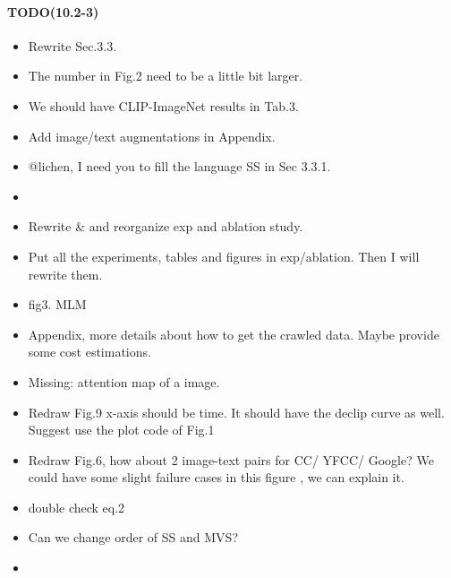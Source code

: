     

\paragraph{TODO(10.2-3)} 
\begin{itemize}
    \item Rewrite Sec.3.3. 
    
    \item The number in Fig.2 need to be a little bit larger.
    
    \item We should have CLIP-ImageNet results in Tab.3.
    
    \item Add image/text augmentations in Appendix.
    
    \item @lichen, I need you to fill the language SS in Sec 3.3.1.
    
    \item {}
    
    \item Rewrite \& and reorganize exp and ablation study. 
    
    \item Put all the experiments, tables and figures in exp/ablation. Then I will rewrite them. 
    
    \item fig3. MLM 
    
    \item Appendix, more details about how to get the crawled data. Maybe provide some cost estimations.
    
    \item Missing: attention map of a image.
    
    \item Redraw Fig.9 x-axis should be time. It should have the declip curve as well. Suggest use the plot code of Fig.1
    
    \item Redraw Fig.6, how about 2 image-text pairs for CC/ YFCC/ Google? We could have some slight failure cases in this figure , we can explain it.
    
    \item double check eq.2
    
    \item Can we change order of SS and MVS?
    
    \item {}
    
\end{itemize}


